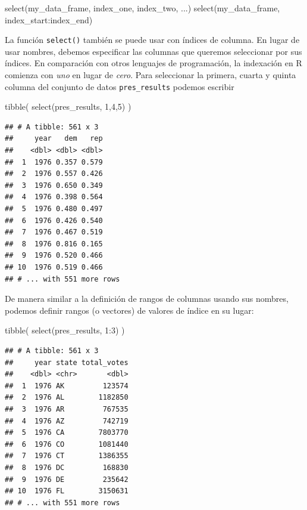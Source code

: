 \documentclass[
]{book}
\newenvironment{Shaded}{\begin{snugshade}}{\end{snugshade}}
\newcommand{\DecValTok}[1]{\textcolor[rgb]{0.00,0.00,0.81}{#1}}
\newcommand{\FunctionTok}[1]{\textcolor[rgb]{0.00,0.00,0.00}{#1}}
\newcommand{\NormalTok}[1]{#1}
\newcommand{\SpecialCharTok}[1]{\textcolor[rgb]{0.00,0.00,0.00}{#1}}
\begin{document}
\begin{Shaded}
\begin{Highlighting}[]
\FunctionTok{select}\NormalTok{(my\_data\_frame, index\_one, index\_two, ...)}
\FunctionTok{select}\NormalTok{(my\_data\_frame, index\_start}\SpecialCharTok{:}\NormalTok{index\_end)}
\end{Highlighting}
\end{Shaded}

La función \texttt{select()} también se puede usar con índices de columna. En lugar de usar nombres, debemos especificar las columnas que queremos seleccionar por sus índices. En comparación con otros lenguajes de programación, la indexación en R comienza con \emph{uno} en lugar de \emph{cero}. Para seleccionar la primera, cuarta y quinta columna del conjunto de datos \texttt{pres\_results} podemos escribir

\begin{Shaded}
\begin{Highlighting}[]
\FunctionTok{tibble}\NormalTok{(}
\FunctionTok{select}\NormalTok{(pres\_results, }\DecValTok{1}\NormalTok{,}\DecValTok{4}\NormalTok{,}\DecValTok{5}\NormalTok{)}
\NormalTok{)}
\end{Highlighting}
\end{Shaded}

\begin{verbatim}
## # A tibble: 561 x 3
##     year   dem   rep
##    <dbl> <dbl> <dbl>
##  1  1976 0.357 0.579
##  2  1976 0.557 0.426
##  3  1976 0.650 0.349
##  4  1976 0.398 0.564
##  5  1976 0.480 0.497
##  6  1976 0.426 0.540
##  7  1976 0.467 0.519
##  8  1976 0.816 0.165
##  9  1976 0.520 0.466
## 10  1976 0.519 0.466
## # ... with 551 more rows
\end{verbatim}

De manera similar a la definición de rangos de columnas usando sus nombres, podemos definir rangos (o vectores) de valores de índice en su lugar:

\begin{Shaded}
\begin{Highlighting}[]
\FunctionTok{tibble}\NormalTok{(}
\FunctionTok{select}\NormalTok{(pres\_results, }\DecValTok{1}\SpecialCharTok{:}\DecValTok{3}\NormalTok{)}
\NormalTok{)}
\end{Highlighting}
\end{Shaded}

\begin{verbatim}
## # A tibble: 561 x 3
##     year state total_votes
##    <dbl> <chr>       <dbl>
##  1  1976 AK         123574
##  2  1976 AL        1182850
##  3  1976 AR         767535
##  4  1976 AZ         742719
##  5  1976 CA        7803770
##  6  1976 CO        1081440
##  7  1976 CT        1386355
##  8  1976 DC         168830
##  9  1976 DE         235642
## 10  1976 FL        3150631
## # ... with 551 more rows
\end{verbatim}
\end{document}
